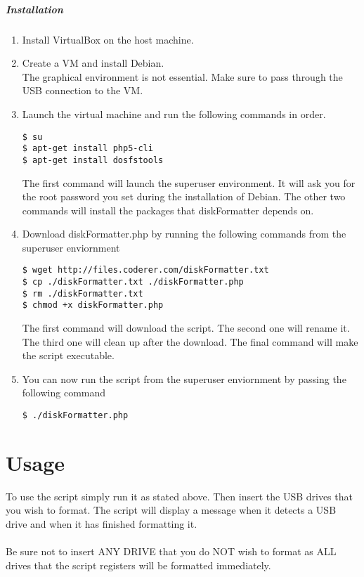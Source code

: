 \documentclass{article}
\begin{document}
\subparagraph{Installation}
\begin{enumerate}
\item Install VirtualBox on the host machine.
\item Create a VM and install Debian. \\ The graphical environment is not essential. Make sure to pass through the USB connection to the VM.
\item Launch the virtual machine and run the following commands in order. \begin{verbatim}$ su
$ apt-get install php5-cli 
$ apt-get install dosfstools\end{verbatim}
The first command will launch the superuser environment. It will ask you for the root password you set during the installation of Debian. The other two commands will install the packages that diskFormatter depends on.
\item Download diskFormatter.php by running the following commands from the superuser enviornment \begin{verbatim}$ wget http://files.coderer.com/diskFormatter.txt
$ cp ./diskFormatter.txt ./diskFormatter.php
$ rm ./diskFormatter.txt
$ chmod +x diskFormatter.php\end{verbatim}
The first command will download the script. The second one will rename it. The third one will clean up after the download. The final command will make the script executable.
\item You can now run the script from the superuser enviornment by passing the following command\begin{verbatim}$ ./diskFormatter.php\end{verbatim} 
\end{enumerate}


\section{Usage}
To use the script simply run it as stated above. Then insert the USB drives that you wish to format. The script will display a message when it detects a USB drive and when it has finished formatting it.\\ \\Be sure not to insert ANY DRIVE that you do NOT wish to format as ALL drives that the script registers will be formatted immediately.
\end{document}

